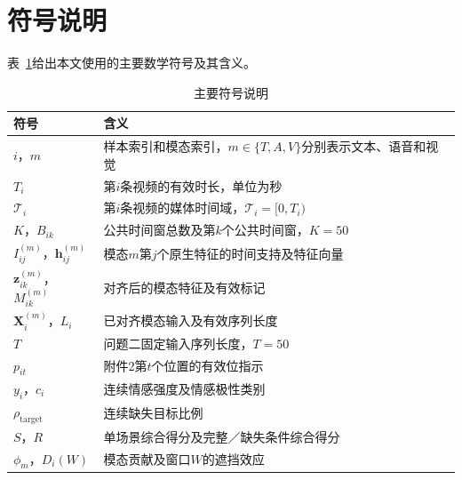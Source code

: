 \section{符号说明}\label{sec:notation}

表~\ref{tab:global_notation}给出本文使用的主要数学符号及其含义。

\begin{table}[!htbp]
\centering\normalsize
\caption{主要符号说明}
\label{tab:global_notation}
\renewcommand{\arraystretch}{1.18}
\begin{tabularx}{\textwidth}{@{}p{}>{\raggedright\arraybackslash}X@{}}
\toprule
符号 & 含义\\
\midrule
$i$，$m$ & 样本索引和模态索引，$m\in\{T,A,V\}$分别表示文本、语音和视觉\\
$T_i$ & 第$i$条视频的有效时长，单位为秒\\
$\mathcal T_i$ & 第$i$条视频的媒体时间域，$\mathcal T_i=[0,T_i)$\\
$K$，$B_{ik}$ & 公共时间窗总数及第$k$个公共时间窗，$K=50$\\
$I_{ij}^{(m)}$，$\mathbf h_{ij}^{(m)}$ & 模态$m$第$j$个原生特征的时间支持及特征向量\\
$\mathbf z_{ik}^{(m)}$，$M_{ik}^{(m)}$ & 对齐后的模态特征及有效标记\\
$\mathbf X_i^{(m)}$，$L_i$ & 已对齐模态输入及有效序列长度\\
$T$ & 问题二固定输入序列长度，$T=50$\\
$p_{it}$ & 附件2第$t$个位置的有效位指示\\
$y_i$，$c_i$ & 连续情感强度及情感极性类别\\
$\rho_{\mathrm{target}}$ & 连续缺失目标比例\\
$S$，$R$ & 单场景综合得分及完整／缺失条件综合得分\\
$\phi_m$，$D_i(W)$ & 模态贡献及窗口$W$的遮挡效应\\
\bottomrule
\end{tabularx}
\end{table}
